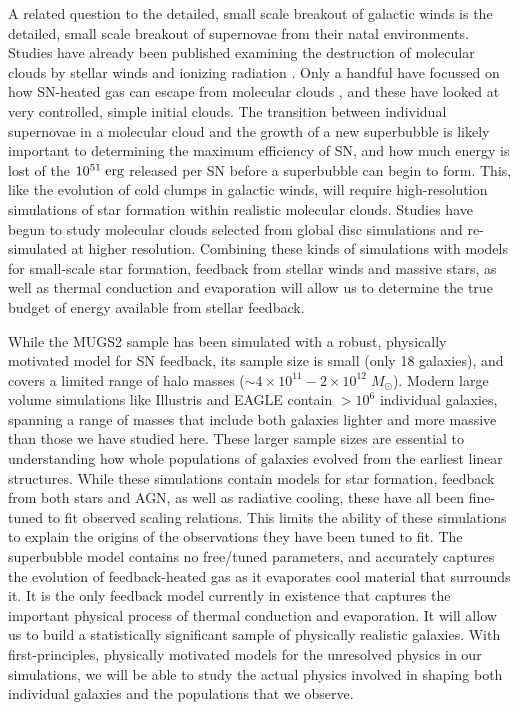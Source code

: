 A related question to the detailed, small scale breakout of galactic winds is
the detailed, small scale breakout of supernovae from their natal environments.
Studies have already been published examining the destruction of molecular
clouds by stellar winds and ionizing radiation \citep{Murray2010,Walch2012}.
Only a handful have focussed on how SN-heated gas can escape from molecular
clouds \citep{Rogers2013}, and these have looked at very controlled, simple
initial clouds.  The transition between individual supernovae in a molecular
cloud and the growth of a new superbubble is likely important to determining the
maximum efficiency of SN, and how much energy is lost of the $10^{51}\;\rm{erg}$
released per SN before a superbubble can begin to form.  This, like the
evolution of cold clumps in galactic winds, will require high-resolution
simulations of star formation within realistic molecular clouds.  Studies have
begun \citep{Dobbs2015} to study molecular clouds selected from global disc
simulations and re-simulated at higher resolution.  Combining these kinds of
simulations with models for small-scale star formation, feedback from stellar
winds and massive stars, as well as thermal conduction and evaporation will
allow us to determine the true budget of energy available from stellar feedback.

While the MUGS2 sample has been simulated with a robust, physically motivated
model for SN feedback, its sample size is small (only 18 galaxies), and covers a
limited range of halo masses ($\sim 4\times10^{11}-2\times10^{12}\;M_\odot$).
Modern large volume simulations like Illustris \citep{Vogelsberger2014b} and
EAGLE \citep{Schaye2015} contain $>10^6$ individual galaxies, spanning a range
of masses that include both galaxies lighter and more massive than those we have
studied here.  These larger sample sizes are essential to understanding how
whole populations of galaxies evolved from the earliest linear structures.
While these simulations contain models for star formation, feedback from both
stars and AGN, as well as radiative cooling, these have all been fine-tuned to
fit observed scaling relations.  This limits the ability of these simulations to
explain the origins of the observations they have been tuned to fit.  The
superbubble model contains no free/tuned parameters, and accurately captures the
evolution of feedback-heated gas as it evaporates cool material that surrounds
it.  It is the only feedback model currently in existence that captures the
important physical process of thermal conduction and evaporation.  It will allow
us to build a statistically significant sample of physically realistic galaxies.
With first-principles, physically motivated models for the unresolved physics in
our simulations, we will be able to study the actual physics involved in shaping
both individual galaxies and the populations that we observe. 


